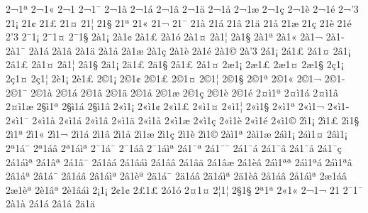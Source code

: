 {2^^ac1^^aa 2^^ac1^^ab 2^^ac1^^ad 2^^ac1^^af 2^^ac1^^e0 2^^ac1^^e1 2^^ac1^^e2 2^^ac1^^e4 
2^^ac1^^e5 2^^ac1^^e6 2^^ac1^^e7 2^^ac1^^e8 2^^ac1^^e9 2^^ac'3 2^^ad1^^a1 2^^ad1^^a2 
2^^ad1^^a3 2^^ad1^^a4 2^^ad1^^a6 2^^ad1^^a7 2^^ad1^^aa 2^^ad1^^ab 2^^ad1^^ac 2^^ad1^^af 
2^^ad1^^e0 2^^ad1^^e1 2^^ad1^^e2 2^^ad1^^e4 2^^ad1^^e5 2^^ad1^^e6 2^^ad1^^e7 2^^ad1^^e8 
2^^ad1^^e9 2^^ad'3 2^^af1^^a1 2^^af1^^a4 2^^af1^^a7 2^^e01^^a1 2^^e01^^a2 2^^e01^^a3 
2^^e01^^f3 2^^e01^^a4 2^^e01^^a6 2^^e01^^a7 2^^e01^^aa 2^^e01^^ab 2^^e01^^ac 2^^e01^^ad 
2^^e01^^af 2^^e01^^e1 2^^e01^^e2 2^^e01^^e4 2^^e01^^e5 2^^e01^^e6 2^^e01^^e7 2^^e01^^e8 
2^^e01^^e9 2^^e01^^a9 2^^e0'3 2^^e11^^a1 2^^e11^^a3 2^^e11^^a4 2^^e21^^a1 2^^e21^^a3 
2^^e21^^a4 2^^e21^^a6 2^^e21^^a7 2^^e41^^a1 2^^e41^^a3 2^^e41^^a7 2^^e51^^a3 2^^e51^^a4 
2^^e61^^a1 2^^e61^^a3 2^^e61^^a4 2^^e61^^a7 2^^e71^^a1 2^^e71^^a4 2^^e71^^a6 2^^e81^^a1 
2^^e81^^a3 2^^a91^^a1 2^^a91^^a2 2^^a91^^a3 2^^a91^^a4 2^^a91^^a6 2^^a91^^a7 2^^a91^^aa 
2^^a91^^ab 2^^a91^^ac 2^^a91^^ad 2^^a91^^af 2^^a91^^e0 2^^a91^^e1 2^^a91^^e2 2^^a91^^e4 
2^^a91^^e5 2^^a91^^e6 2^^a91^^e7 2^^a91^^e8 2^^a91^^e9 2^^a4^^ec1^^aa 2^^a4^^ec1^^e1 2^^a4^^ec1^^e2 
2^^a4^^ec1^^e6 2^^a7^^ec1^^aa 2^^a7^^ec1^^e1 2^^a7^^ec1^^e2 2^^ab^^ec1^^a1 2^^ab^^ec1^^a2 2^^ab^^ec1^^a3 2^^ab^^ec1^^a4 
2^^ab^^ec1^^a6 2^^ab^^ec1^^a7 2^^ab^^ec1^^aa 2^^ab^^ec1^^ac 2^^ab^^ec1^^ad 2^^ab^^ec1^^af 2^^ab^^ec1^^e0 2^^ab^^ec1^^e1 
2^^ab^^ec1^^e2 2^^ab^^ec1^^e4 2^^ab^^ec1^^e5 2^^ab^^ec1^^e6 2^^ab^^ec1^^e7 2^^ab^^ec1^^e8 2^^ab^^ec1^^e9 2^^ab^^ec1^^a9 
2^^ad^^ec1^^a1 2^^ad^^ec1^^a3 2^^ad^^ec1^^a7 2^^ad^^ec1^^aa 2^^ad^^ec1^^ab 2^^ad^^ec1^^ac 2^^ad^^ec1^^e1 2^^ad^^ec1^^e2 
2^^ad^^ec1^^e5 2^^ad^^ec1^^e6 2^^ad^^ec1^^e7 2^^ad^^ec1^^e8 2^^ad^^ec1^^a9 2^^e0^^ec1^^aa 2^^e0^^ec1^^e6 2^^e1^^ec1^^a1 
2^^e1^^ec1^^a4 2^^e2^^ec1^^a1 
2^^aa1^^e1^^af 2^^aa1^^e1^^e2 2^^aa1^^e1^^ec^^aa 2^^af1^^e1^^af 2^^af1^^e1^^e2 2^^af1^^e1^^ec^^aa 2^^e11^^af^^aa 2^^e11^^af^^af 
2^^e11^^af^^e1 2^^e11^^af^^e2 2^^e11^^af^^e5 2^^e11^^af^^e7 2^^e11^^e1^^ec^^aa 2^^e11^^e2^^aa 2^^e11^^e2^^af 2^^e11^^e2^^e1 
2^^e11^^e2^^e1^^ec 2^^e11^^e2^^e2 2^^e11^^e2^^e4 2^^e11^^e2^^e6 2^^e11^^e8^^e2 2^^e1^^ec1^^aa^^aa 2^^e1^^ec1^^aa^^e1 2^^e1^^ec1^^aa^^e2 
2^^e21^^e1^^aa 2^^e21^^e1^^af 2^^e21^^e1^^e2 2^^e21^^e1^^ec^^aa 2^^e21^^e8^^aa 2^^e41^^e1^^af 2^^e41^^e1^^e2 2^^e41^^e1^^ec^^aa 
2^^e41^^e8^^e2 2^^e51^^e1^^e2 2^^e51^^e1^^ec^^aa 2^^e61^^e1^^e2 2^^e61^^e8^^aa 2^^e81^^e2^^aa 2^^e81^^e2^^e1^^ec 
2^^a11^^a1 2^^a21^^a2 2^^a31^^a3 2^^f31^^f3 2^^a41^^a4 2^^a61^^a6 2^^a71^^a7 2^^aa1^^aa 
2^^ab1^^ab 2^^ac1^^ac 2^^ad1^^ad 2^^af1^^af 2^^e01^^e0 2^^e11^^e1 2^^e21^^e2 2^^e41^^e4 
}
